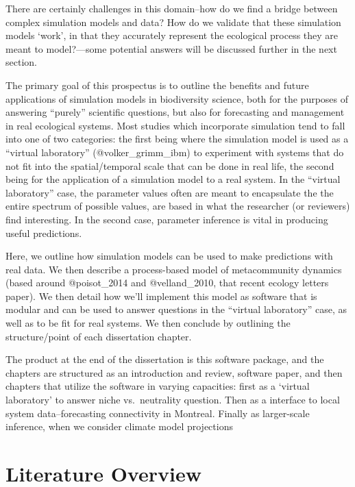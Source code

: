There are certainly challenges in this domain--how do we find a bridge
between complex simulation models and data? How do we validate that
these simulation models `work', in that they accurately represent the
ecological process they are meant to model?---some potential answers
will be discussed further in the next section.

The primary goal of this prospectus is to outline the benefits and
future applications of simulation models in biodiversity science, both
for the purposes of answering ``purely'' scientific questions, but also
for forecasting and management in real ecological systems. Most studies
which incorporate simulation tend to fall into one of two categories:
the first being where the simulation model is used as a ``virtual
laboratory'' (@volker\_grimm\_ibm) to experiment with systems that do
not fit into the spatial/temporal scale that can be done in real life,
the second being for the application of a simulation model to a real
system. In the ``virtual laboratory'' case, the parameter values often
are meant to encapsulate the the entire spectrum of possible values, are
based in what the researcher (or reviewers) find interesting. In the
second case, parameter inference is vital in producing useful
predictions.

Here, we outline how simulation models can be used to make predictions
with real data. We then describe a process-based model of metacommunity
dynamics (based around @poisot\_2014 and @velland\_2010, that recent
ecology letters paper). We then detail how we'll implement this model as
software that is modular and can be used to answer questions in the
``virtual laboratory'' case, as well as to be fit for real systems. We
then conclude by outlining the structure/point of each dissertation
chapter.

The product at the end of the dissertation is this software package, and
the chapters are structured as an introduction and review, software
paper, and then chapters that utilize the software in varying
capacities: first as a `virtual laboratory' to answer niche
vs.~neutrality question. Then as a interface to local system
data--forecasting connectivity in Montreal. Finally as larger-scale
inference, when we consider climate model projections

\hypertarget{literature-overview}{%
\section{Literature Overview}\label{literature-overview}}

